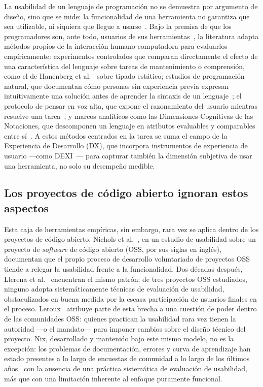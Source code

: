 La usabilidad de un lenguaje de programación no se demuestra por argumento de diseño, sino que se mide: la funcionalidad de una herramienta no garantiza que sea utilizable, ni siquiera que llegue a usarse~\cite{goodwinFunctionalityUsability1987}. Bajo la premisa de que los programadores son, ante todo, usuarios de sus herramientas~\cite{Myers2016a}, la literatura adapta métodos propios de la interacción humano-computadora para evaluarlos empíricamente: experimentos controlados que comparan directamente el efecto de una característica del lenguaje sobre tareas de mantenimiento o comprensión, como el de Hanenberg et al.~\cite{hanenbergEmpiricalStudyImpact2013} sobre tipado estático; estudios de programación natural, que documentan cómo personas sin experiencia previa expresan intuitivamente una solución antes de aprender la sintaxis de un lenguaje~\cite{paneStudyingLanguageStructure2001,panePDFMoreNatural2006}; el protocolo de pensar en voz alta, que expone el razonamiento del usuario mientras resuelve una tarea~\cite{PDFThinkAloud}; y marcos analíticos como las Dimensiones Cognitivas de las Notaciones, que descomponen un lenguaje en atributos evaluables y comparables entre sí~\cite{PDFCognitiveDimensions,mernikPDFComparisonXAML2009}. A estos métodos centrados en la tarea se suma el campo de la Experiencia de Desarrollo (DX), que incorpora instrumentos de experiencia de usuario ---como DEXI~\cite{Kuusinen2016}--- para capturar también la dimensión subjetiva de usar una herramienta, no solo su desempeño medible.

\subsection{Los proyectos de código abierto ignoran estos aspectos}

Esta caja de herramientas empíricas, sin embargo, rara vez se aplica dentro de los proyectos de código abierto. Nichols et al.~\cite{Nichols2001}, en un estudio de usabilidad sobre un proyecto de \emph{software} de código abierto (OSS, por sus siglas en inglés), documentan que el propio proceso de desarrollo voluntariado de proyectos OSS tiende a relegar la usabilidad frente a la funcionalidad. Dos décadas después, Llerena et al.~\cite{Llerena2025} encuentran el mismo patrón: de tres proyectos OSS estudiados, ninguno adopta sistemáticamente técnicas de evaluación de usabilidad, obstaculizados en buena medida por la escasa participación de usuarios finales en el proceso. Leroux~\cite{Leroux2019} atribuye parte de esta brecha a una cuestión de poder dentro de las comunidades OSS: quienes practican la usabilidad rara vez tienen la autoridad ---o el mandato--- para imponer cambios sobre el diseño técnico del proyecto. Nix, desarrollado y mantenido bajo este mismo modelo, no es la excepción: los problemas de documentación, errores y curva de aprendizaje han estado presentes a lo largo de encuestas de comunidad a lo largo de los últimos años~\cite{2022NixSurvey2022,2025CommunitySurvey,NixCommunitySurvey2023,NixCommunitySurvey2024} con la ausencia de una práctica sistemática de evaluación de usabilidad, más que con una limitación inherente al enfoque puramente funcional.

